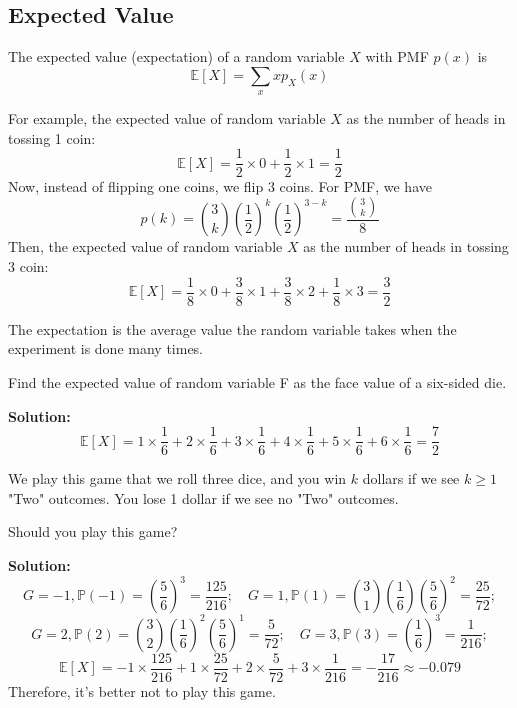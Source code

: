 \subsection{Expected Value}
\begin{definition}
  The expected value (expectation) of a random variable \(X\) with PMF \(p(x)\) is 
  \[
    \mathbb{E}[X] = \sum_{x} xp_X (x)
  \]
\end{definition}

For example, the expected value of random variable \(X\) as the number of heads in tossing 1 coin:
\[
  \mathbb{E}[X] = \dfrac{1}{2} \times 0 + \dfrac{1}{2} \times 1 = \dfrac{1}{2}
\]
Now, instead of flipping one coins, we flip 3 coins. For PMF, we have 
\[
  p(k) = \binom{3}{k} (\dfrac{1}{2})^k (\dfrac{1}{2})^{3-k} = \dfrac{\binom{3}{k}}{8}
\]
Then, the expected value of random variable \(X\) as the number of heads in tossing 3 coin:
\[
  \mathbb{E}[X] = \dfrac{1}{8} \times 0 + \dfrac{3}{8} \times 1 + \dfrac{3}{8} \times 2 + \dfrac{1}{8} \times 3 = \dfrac{3}{2}
\]

The expectation is the average value the random variable takes when the experiment is done many times.

\begin{eg}
  Find the expected value of random variable F as the face value of a six-sided die. 

  \textbf{Solution:} 
  \[
    \mathbb{E}[X] = 1 \times \dfrac{1}{6} + 2 \times \dfrac{1}{6} + 3 \times \dfrac{1}{6} + 4 \times \dfrac{1}{6} + 5 \times \dfrac{1}{6} + 6 \times \dfrac{1}{6} = \dfrac{7}{2}
  \]
\end{eg}

\begin{eg}
  We play this game that we roll three dice, and you win \(k\) dollars if we see \(k \geq 1\) "Two" outcomes. You lose 1 dollar if we see no "Two" outcomes.

  Should you play this game?

  \textbf{Solution:}
  \[
    G = -1, \mathbb{P}(-1) = (\dfrac{5}{6})^3 = \dfrac{125}{216};\quad G = 1, \mathbb{P}(1) = \binom{3}{1}(\dfrac{1}{6})(\dfrac{5}{6})^2 = \dfrac{25}{72};
  \]
  \[
    G = 2, \mathbb{P}(2) = \binom{3}{2}(\dfrac{1}{6})^2(\dfrac{5}{6})^1 = \dfrac{5}{72};\quad G = 3, \mathbb{P}(3) = (\dfrac{1}{6})^3 = \dfrac{1}{216};
  \]
  \[
    \mathbb{E}[X] = -1 \times \dfrac{125}{216} + 1 \times \dfrac{25}{72} + 2 \times \dfrac{5}{72} + 3 \times \dfrac{1}{216} = - \dfrac{17}{216} \approx -0.079
  \]
  Therefore, it’s better not to play this game. 
\end{eg}

